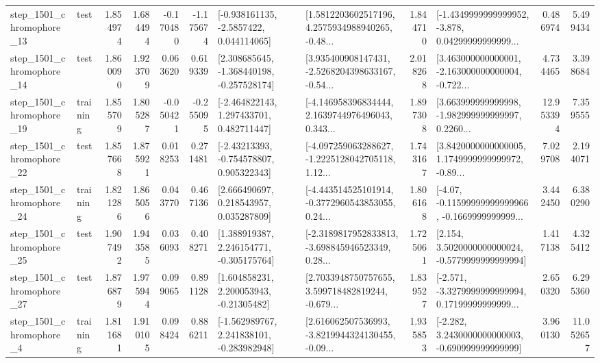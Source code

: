 \begin{tabular}{llrrrrllrlrr}
 step\_1501\_chromophore\_13 &      test &      1.854974 &    1.684494 &     -0.170480 & -1.175674 &     [-0.938161135, -2.5857422, 0.044114065] &  [1.5812203602517196, 4.2575934988940265, -0.48... &       1.844710 &  [-1.4349999999999952, -3.878, 0.04299999999999... &            0.486974 &          5.499434 \\
 step\_1501\_chromophore\_14 &      test &      1.860090 &    1.923709 &      0.063620 &  0.619339 &   [2.308685645, -1.368440198, -0.257528174] &  [3.935400908147431, -2.5268204398633167, -0.54... &       2.018268 &  [3.463000000000001, -2.163000000000004, -0.722... &            4.734465 &          3.398684 \\
 step\_1501\_chromophore\_19 &  training &      1.855709 &    1.805287 &     -0.050421 & -0.255095 &    [-2.464822143, 1.297433701, 0.482711447] &  [-4.146958396834444, 2.1639744976496043, 0.343... &       1.897308 &  [3.663999999999998, -1.982999999999997, 0.2260... &           12.953394 &          7.359555 \\
 step\_1501\_chromophore\_22 &      test &      1.857668 &    1.875921 &      0.018253 &  0.271481 &    [-2.43213393, -0.754578807, 0.905322343] &  [-4.097259063288627, -1.2225128042705118, 1.12... &       1.743167 &  [3.8420000000000005, 1.1749999999999972, -0.89... &            7.029708 &          2.194071 \\
 step\_1501\_chromophore\_24 &  training &      1.821286 &    1.865056 &      0.043770 &  0.467136 &     [2.666490697, 0.218543957, 0.035287809] &  [-4.443514525101914, -0.3772960543853055, 0.24... &       1.806168 &  [-4.07, -0.11599999999999966, -0.1669999999999... &            3.442450 &          6.380290 \\
 step\_1501\_chromophore\_25 &      test &      1.907492 &    1.943585 &      0.036093 &  0.408271 &    [1.388919387, 2.246154771, -0.305175764] &  [-2.3189817952833813, -3.698845946523349, 0.28... &       1.725061 &   [2.154, 3.5020000000000024, -0.5779999999999994] &            1.417138 &          4.325412 \\
 step\_1501\_chromophore\_27 &      test &      1.876879 &    1.975944 &      0.099065 &  0.891128 &     [1.604858231, 2.200053943, -0.21305482] &  [2.7033948750757655, 3.599718482819244, -0.679... &       1.839527 &  [-2.571, -3.3279999999999994, 0.17199999999999... &            2.650320 &          6.295360 \\
  step\_1501\_chromophore\_4 &  training &      1.811681 &    1.910105 &      0.098424 &  0.886211 &   [-1.562989767, 2.241838101, -0.283982948] &  [2.616062507536993, -3.8219944324130455, -0.09... &       1.935853 &   [-2.282, 3.2430000000000003, -0.690999999999999] &            3.960130 &         11.052657 \\

\end{tabular}
